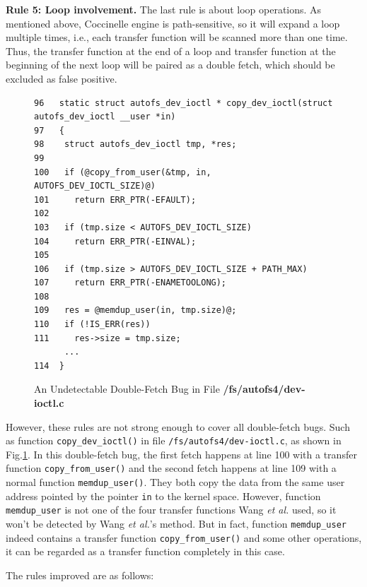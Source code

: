 \documentclass[10pt]{llncs}
\begin{document}
\textbf{Rule 5: Loop involvement.}
The last rule is about loop operations. As mentioned above, Coccinelle engine is path-sensitive, so it will expand a loop multiple times, i.e., each transfer function will be scanned more than one time. Thus, the transfer function at the end of a loop and transfer function at the beginning of the next loop will be paired as a double fetch, which should be excluded as false positive.




\begin{figure}[t]
  \centering
\begin{lstlisting}[style=code]
96   static struct autofs_dev_ioctl * copy_dev_ioctl(struct autofs_dev_ioctl __user *in)
97   {
98    struct autofs_dev_ioctl tmp, *res;
99   
100   if (@copy_from_user(&tmp, in, AUTOFS_DEV_IOCTL_SIZE)@)
101     return ERR_PTR(-EFAULT);
102  
103   if (tmp.size < AUTOFS_DEV_IOCTL_SIZE)
104     return ERR_PTR(-EINVAL);
105  
106   if (tmp.size > AUTOFS_DEV_IOCTL_SIZE + PATH_MAX)
107     return ERR_PTR(-ENAMETOOLONG);
108  
109   res = @memdup_user(in, tmp.size)@;
110   if (!IS_ERR(res))
111     res->size = tmp.size;
	  ...
114  }   
\end{lstlisting}
  \caption{An Undetectable Double-Fetch Bug in File \textbf{/fs/autofs4/dev-ioctl.c}}
  \label{dev-ioctl}
\end{figure}




However, these rules are not strong enough to cover all double-fetch bugs. Such as function \verb:copy_dev_ioctl(): in file \verb:/fs/autofs4/dev-ioctl.c:, as shown in Fig.\ref{dev-ioctl}. In this double-fetch bug, the first fetch happens at line 100 with a transfer function \verb:copy_from_user(): and the second fetch happens at line 109 with a normal function \verb:memdup_user():. They both copy the data from the same user address pointed by the pointer \verb:in: to the kernel space. However, function \verb:memdup_user: is not one of the four transfer functions Wang \textit{et al.} used, so it won't be detected by Wang \textit{et al.}'s method. But in fact, function \verb:memdup_user: indeed contains a transfer function \verb:copy_from_user(): and some other operations, it can be regarded as a transfer function completely in this case.

The rules improved are as follows:
\end{document}
